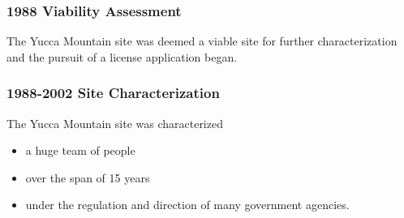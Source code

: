
\begin{frame}[ctb!]
    \frametitle{1988 Viability Assessment}
    The Yucca Mountain site was deemed a viable site for further 
    characterization and the pursuit of a license application began. 

  \end{frame}

\begin{frame}[ctb!]
    \frametitle{1988-2002 Site Characterization}
    The Yucca Mountain site was characterized 
    \begin{itemize}
      \item a huge team of people 
      \item over the span of 15 years
      \item under the regulation and direction of many government agencies.
    \end{itemize}
  \end{frame}

